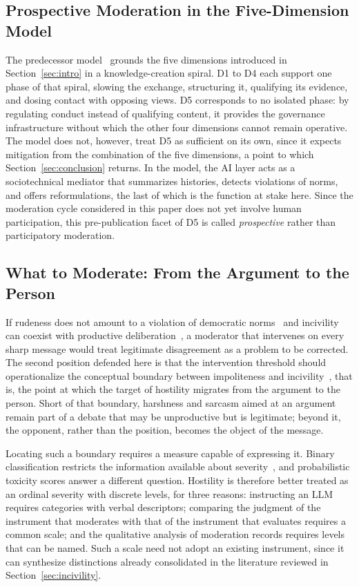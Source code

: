 \documentclass[conference]{IEEEtran}
\begin{document}
\subsection{Prospective Moderation in the Five-Dimension Model}\label{sec:d5}

The predecessor model~\cite{moura2026hostility} grounds the five dimensions
introduced in Section~\ref{sec:intro} in a knowledge-creation spiral. D1 to D4
each support one phase of that spiral, slowing the exchange, structuring it,
qualifying its evidence, and dosing contact with opposing views. D5
corresponds to no isolated phase: by regulating conduct instead of qualifying
content, it provides the governance infrastructure without which the other
four dimensions cannot remain operative. The model does not, however, treat D5
as sufficient on its own, since it expects mitigation from the combination of
the five dimensions, a point to which Section~\ref{sec:conclusion} returns. In
the model, the AI layer acts as a sociotechnical mediator that summarizes
histories, detects violations of norms, and offers reformulations, the last of
which is the function at stake here. Since the moderation cycle considered in
this paper does not yet involve human participation, this pre-publication
facet of D5 is called \textit{prospective} rather than participatory
moderation.

\subsection{What to Moderate: From the Argument to the Person}\label{sec:threshold}

If rudeness does not amount to a violation of democratic
norms~\cite{papacharissi2004democracy} and incivility can coexist with
productive deliberation~\cite{rossini2022beyond}, a moderator that intervenes
on every sharp message would treat legitimate disagreement as a problem to be
corrected. The second position defended here is that the intervention
threshold should operationalize the conceptual boundary between impoliteness
and incivility~\cite{papacharissi2004democracy,rossini2022beyond}, that is,
the point at which the target of hostility migrates from the argument to the
person. Short of that boundary, harshness and sarcasm aimed at an argument
remain part of a debate that may be unproductive but is legitimate; beyond
it, the opponent, rather than the position, becomes the object of the
message.

Locating such a boundary requires a measure capable of expressing it. Binary
classification restricts the information available about
severity~\cite{kennedy2020constructing}, and probabilistic toxicity scores
answer a different question. Hostility is therefore better treated as an
ordinal severity with discrete levels, for three reasons: instructing an LLM
requires categories with verbal descriptors; comparing the judgment of the
instrument that moderates with that of the instrument that evaluates requires
a common scale; and the qualitative analysis of moderation records requires
levels that can be named. Such a scale need not adopt an existing instrument,
since it can synthesize distinctions already consolidated in the literature
reviewed in Section~\ref{sec:incivility}.
\end{document}

